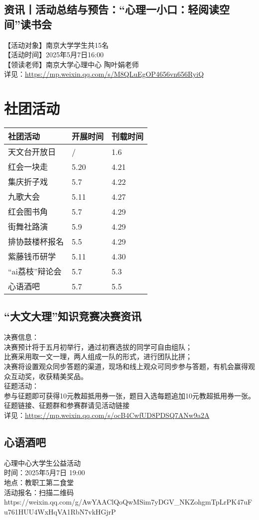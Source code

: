 \documentclass[letterpaper, 12pt]{article}
\begin{document}
\begin{multicols}{2}
\subsection{资讯丨活动总结与预告：“心理一小口：轻阅读空间”读书会} %
【活动对象】南京大学学生共15名
\\【活动时间】2025年5月7日16:00
\\【领读老师】南京大学心理中心 陶叶娟老师
\\详见：\url{https://mp.weixin.qq.com/s/M8QLuEgOP4656vn656RyiQ}

\section{社团活动}
\begin{tabular}{|>{\centering\arraybackslash}m{}|m{}|m{}|}
    \hline
    社团活动 & 开展时间 & 刊载时间\\
    \hline\hline
    天文台开放日 & / & 1.6\\
    红会一块走 & 5.20 & 4.21\\
    集庆折子戏 & 5.7 & 4.22\\
    九歌大会 & 5.11 & 4.27\\
    红会图书角 & 5.7 & 4.29\\
    街舞社路演 & 5.9 & 4.29\\
    排协鼓楼杯报名 & 5.5 & 4.29\\
    紫藤钱币研学 & 5.11 & 4.30\\
    “ai荔枝”辩论会 & 5.7 & 5.3\\
    心语酒吧 & 5.7 & 5.5\\
    \hline
\end{tabular}
\subsection{“大文大理”知识竞赛决赛资讯} %
决赛信息：
\\决赛预计将于五月初举行，通过初赛选拔的同学可自由组队；
\\比赛采用取一文一理，两人组成一队的形式，进行团队比拼；
\\决赛将设置观众同步答题的渠道，现场和线上观众可同步参与答题，有机会赢得观众互动奖，收获精美奖品。
\\征题活动：
\\参与征题即可获得10元教超抵用券一张，题目入选每题追加10元教超抵用券一张。
\\征题链接、征题群和参赛群请见活动链接
\\详见：\url{https://mp.weixin.qq.com/s/ocB4CwfUD8PDSQ7ANw9a2A}


\subsection{心语酒吧} %
心理中心大学生公益活动
\\时间：2025年5月7日 19:00
\\地点：教职工第二食堂
\\活动报名：扫描二维码https://weixin.qq.com/g/AwYAAClQoQwMSim7yDGV\_NKZohgmTpLrPK47uFu761HUU4WxHqVA1RbN7vkHGjrP
\end{multicols}
\end{document}
